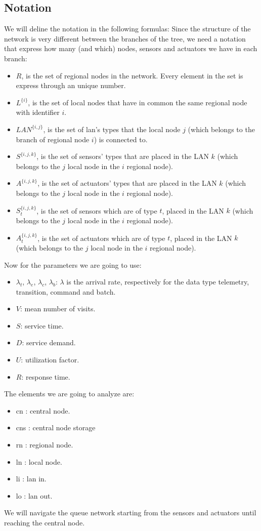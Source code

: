 \documentclass[11pt]{article}
\begin{document}
\subsection{Notation}
We will deline the notation in the following formulas:
Since the structure of the network is very different between the branches of the tree, we need a notation that express how many (and which) nodes, sensors and actuators we have in each branch:
\begin{itemize}
\item $R$, is the set of regional nodes in the network. Every element in the set is express through an unique number.
\item $L^{\{i\}}$, is the set of local nodes that have in common the same regional node with identifier $i$.
\item $LAN^{\{i,j\}}$, is the set of lan's types that the local node $j$ (which belongs to the branch of regional node $i$) is connected to.
\item $S^{\{i,j,k\}}$, is the set of sensors' types that are placed in the LAN $k$ (which belongs to the $j$ local node in the $i$ regional node).
\item $A^{\{i,j,k\}}$, is the set of actuators' types that are placed in the LAN $k$ (which belongs to the $j$ local node in the $i$ regional node).
\item $S^{\{i,j,k\}}_{t}$, is the set of sensors which are of type $t$, placed in the LAN $k$ (which belongs to the $j$ local node in the $i$ regional node).
\item $A^{\{i,j,k\}}_{t}$, is the set of actuators which are of type $t$, placed in the LAN $k$ (which belongs to the $j$ local node in the $i$ regional node).
\end{itemize}
Now for the parameters we are going to use:
\begin{itemize}
\item $\lambda_t$, $\lambda_e$, $\lambda_c$, $\lambda_b$: $\lambda$ is the arrival rate, respectively for the data type telemetry, transition, command and batch.
\item $V$: mean number of visits.
\item $S$: service time.
\item $D$: service demand.
\item $U$: utilization factor.
\item $R$: response time.
\end{itemize}
The elements we are going to analyze are:
\begin{itemize}
\item cn : central node.
\item cns : central node storage
\item rn : regional node.
\item ln : local node.
\item li : lan in.
\item lo : lan out.
\end{itemize}
We will navigate the queue network starting from the sensors and actuators until reaching the central node.
\end{document}
